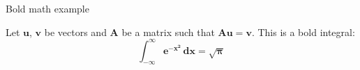 
\begin{frame}{Bold math example}

    Let $\bm{u}$, $\bm{v}$ be vectors and $\bm{A}$ be a
    matrix such that $\bm{Au}=\bm{v}$.
    This is a bold integral:
    \[
    \bm{\int_{-\infty}^{\infty} e^{-x^2}\,dx=\sqrt{\pi} }
    \]
    
\end{frame}
    